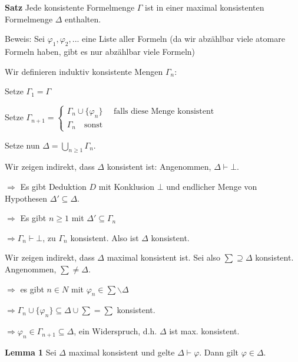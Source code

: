 \documentclass[a4paper]{article}
\renewcommand{\note}[2]{\begin{noteBox} \textbf{#1} #2 \end{noteBox}}
\begin{document}
\begin{multicols}{3}
  \note{Satz}{Jede konsistente Formelmenge $\Gamma$ ist in einer maximal konsistenten Formelmenge $\Delta$ enthalten.}

  Beweis: Sei $\varphi_1,\varphi_2,...$ eine Liste aller Formeln (da wir abzählbar viele atomare
  Formeln haben, gibt es nur abzählbar viele Formeln)

  Wir definieren induktiv konsistente Mengen $\Gamma_n$:
  \begin{itemize*}
    \item Setze $\Gamma_1 = \Gamma$
    \item Setze $\Gamma_{n+1}= \begin{cases} \Gamma_n\cup\{\varphi_n\}\quad\text{ falls diese Menge konsistent} \\ \Gamma_n \quad\text{sonst}\end{cases}$
  \end{itemize*}

  Setze nun $\Delta =\bigcup_{n\geq 1} \Gamma_n$.
  \begin{enumerate*}
    \item Wir zeigen indirekt, dass $\Delta$ konsistent ist: Angenommen, $\Delta\vdash\bot$.
    \begin{itemize*}
      \item $\Rightarrow$ Es gibt Deduktion $D$ mit Konklusion $\bot$ und endlicher Menge von Hypothesen $\Delta'\subseteq\Delta$.
      \item $\Rightarrow$ Es gibt $n\geq 1$ mit $\Delta'\subseteq\Gamma_n$
      \item $\Rightarrow \Gamma_n\vdash\bot$, zu $\Gamma_n$ konsistent. Also ist $\Delta$ konsistent.
    \end{itemize*}
    \item Wir zeigen indirekt, dass $\Delta$ maximal konsistent ist. Sei also $\sum\supseteq\Delta$
    konsistent. Angenommen, $\sum\not=\Delta$.
    \begin{itemize*}
      \item $\Rightarrow$ es gibt $n\in N$ mit $\varphi_n\in\sum\backslash\Delta$
      \item $\Rightarrow \Gamma_n\cup\{\varphi_n\}\subseteq\Delta\cup\sum= \sum$ konsistent.
      \item $\Rightarrow \varphi_n \in\Gamma_{n+1}\subseteq \Delta$, ein Widerspruch, d.h. $\Delta$ ist max. konsistent.
    \end{itemize*}
  \end{enumerate*}

  \note{Lemma 1}{Sei $\Delta$ maximal konsistent und gelte $\Delta\vdash\varphi$. Dann gilt $\varphi\in\Delta$.}


\end{multicols}
\end{document}
